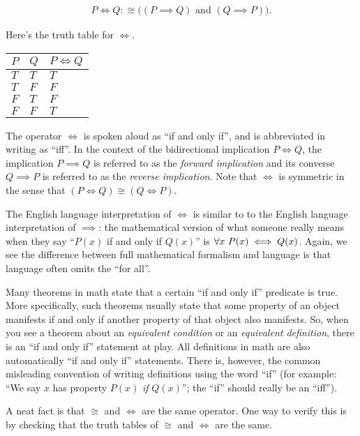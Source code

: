 \begin{align*}
    P \iff Q :\cong \Big( (P \implies Q) \text{ and } (Q \implies P) \Big).
\end{align*}

Here's the truth table for $\iff$.

\begin{table}[H]
    \centering
    \begin{tabular}{|l|l|l|}
    \hline
    $P$ & $Q$ & $P \iff Q$ \\ \hline
    $T$ & $T$ & $T$        \\ \hline
    $T$ & $F$ & $F$        \\ \hline
    $F$ & $T$ & $F$        \\ \hline
    $F$ & $F$ & $T$        \\ \hline
    \end{tabular}
\end{table}

The operator $\iff$ is spoken aloud as ``if and only if'', and is abbreviated in writing as ``iff''. In the context of the bidirectional implication $P \iff Q$, the implication $P \implies Q$ is referred to as the \textit{forward implication} and its converse $Q \implies P$ is referred to as the \textit{reverse implication}. Note that $\iff$ is symmetric in the sense that $(P \iff Q) \cong (Q \iff P)$.

The English language interpretation of $\iff$ is similar to to the English language interpretation of $\implies$: the mathematical version of what someone really means when they say ``$P(x)$ if and only if $Q(x)$'' is $\forall x \text{ } P(x) \iff Q(x)$. Again, we see the difference between full mathematical formalism and language is that language often omits the ``for all''.

Many theorems in math state that a certain ``if and only if'' predicate is true. More specifically, such theorems usually state that some property of an object manifests if and only if another property of that object also manifests. So, when you see a theorem about an \textit{equivalent condition} or an \textit{equivalent definition}, there is an ``if and only if'' statement at play. All definitions in math are also automatically ``if and only if'' statements. There is, however, the common misleading convention of writing definitions using the word ``if'' (for example: ``We say $x$ has property $P(x)$ \textit{if} $Q(x)$''; the ``if'' should really be an ``iff'').

A neat fact is that $\cong$ and $\iff$ are the same operator. One way to verify this is by checking that the truth tables of $\cong$ and $\iff$ are the same.

